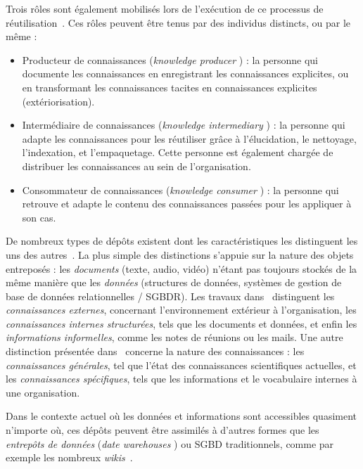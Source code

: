 \bigskip

Trois rôles sont également mobilisés lors de l'exécution de ce processus de réutilisation~\cite{markus2001toward}.
Ces rôles peuvent être tenus par des individus distincts, ou par le même :

\begin{itemize}
\item Producteur de connaissances (\og \textit{knowledge producer} \fg) : la personne qui documente les connaissances en enregistrant les connaissances explicites, ou en transformant les connaissances tacites en connaissances explicites (extériorisation).

\item Intermédiaire de connaissances (\og \textit{knowledge intermediary} \fg) : la personne qui adapte les connaissances pour les réutiliser grâce à l'élucidation, le nettoyage, l'indexation, et l'empaquetage.
Cette personne est également chargée de distribuer les connaissances au sein de l'organisation.

\item Consommateur de connaissances (\og \textit{knowledge consumer} \fg) : la personne qui retrouve et adapte le contenu des connaissances passées pour les appliquer à son cas.
\end{itemize}

\bigskip

De nombreux types de dépôts existent dont les caractéristiques les distinguent les uns des autres~\cite{markus2001toward}.
La plus simple des distinctions s'appuie sur la nature des objets entreposés : les \textit{documents} (texte, audio, vidéo) n'étant pas toujours stockés de la même manière que les \textit{données} (structures de données, systèmes de gestion de base de données relationnelles / SGBDR).
Les travaux dans~\cite{davenport1998successful} distinguent les \textit{connaissances externes}, concernant l'environnement extérieur à l'organisation, les \textit{connaissances internes structurées}, tels que les documents et données, et enfin les \textit{informations informelles}, comme les notes de réunions ou les mails.
Une autre distinction présentée dans~\cite{zack1999managing} concerne la nature des connaissances : les \textit{connaissances générales}, tel que l'état des connaissances scientifiques actuelles, et les \textit{connaissances spécifiques}, tels que les informations et le vocabulaire internes à une organisation.

Dans le contexte actuel où les données et informations sont accessibles quasiment n'importe où, ces dépôts peuvent être assimilés à d'autres formes que les \textit{entrepôts de données} (\og \textit{date warehouses} \fg) ou SGBD traditionnels, comme par exemple les nombreux \textit{wikis}~\cite{schacht2016methodology}.

